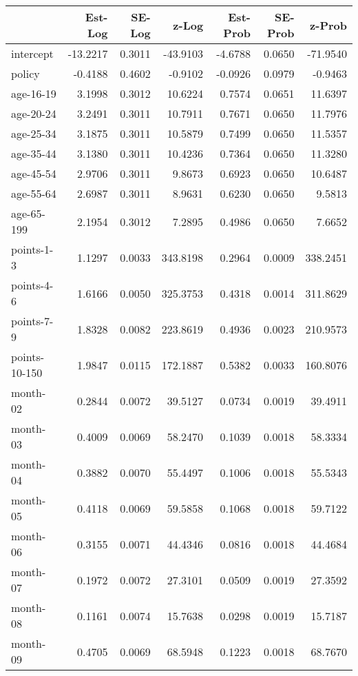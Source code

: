 \documentclass[10pt]{article}
\begin{document}
\begin{table}[ht]
\centering
\begin{tabular}{lrrrrrr}
  \hline
 & Est-Log & SE-Log & z-Log & Est-Prob & SE-Prob & z-Prob \\ 
  \hline
intercept & -13.2217 & 0.3011 & -43.9103 & -4.6788 & 0.0650 & -71.9540 \\ 
  policy & -0.4188 & 0.4602 & -0.9102 & -0.0926 & 0.0979 & -0.9463 \\ 
  age-16-19 & 3.1998 & 0.3012 & 10.6224 & 0.7574 & 0.0651 & 11.6397 \\ 
  age-20-24 & 3.2491 & 0.3011 & 10.7911 & 0.7671 & 0.0650 & 11.7976 \\ 
  age-25-34 & 3.1875 & 0.3011 & 10.5879 & 0.7499 & 0.0650 & 11.5357 \\ 
  age-35-44 & 3.1380 & 0.3011 & 10.4236 & 0.7364 & 0.0650 & 11.3280 \\ 
  age-45-54 & 2.9706 & 0.3011 & 9.8673 & 0.6923 & 0.0650 & 10.6487 \\ 
  age-55-64 & 2.6987 & 0.3011 & 8.9631 & 0.6230 & 0.0650 & 9.5813 \\ 
  age-65-199 & 2.1954 & 0.3012 & 7.2895 & 0.4986 & 0.0650 & 7.6652 \\ 
  points-1-3 & 1.1297 & 0.0033 & 343.8198 & 0.2964 & 0.0009 & 338.2451 \\ 
  points-4-6 & 1.6166 & 0.0050 & 325.3753 & 0.4318 & 0.0014 & 311.8629 \\ 
  points-7-9 & 1.8328 & 0.0082 & 223.8619 & 0.4936 & 0.0023 & 210.9573 \\ 
  points-10-150 & 1.9847 & 0.0115 & 172.1887 & 0.5382 & 0.0033 & 160.8076 \\ 
  month-02 & 0.2844 & 0.0072 & 39.5127 & 0.0734 & 0.0019 & 39.4911 \\ 
  month-03 & 0.4009 & 0.0069 & 58.2470 & 0.1039 & 0.0018 & 58.3334 \\ 
  month-04 & 0.3882 & 0.0070 & 55.4497 & 0.1006 & 0.0018 & 55.5343 \\ 
  month-05 & 0.4118 & 0.0069 & 59.5858 & 0.1068 & 0.0018 & 59.7122 \\ 
  month-06 & 0.3155 & 0.0071 & 44.4346 & 0.0816 & 0.0018 & 44.4684 \\ 
  month-07 & 0.1972 & 0.0072 & 27.3101 & 0.0509 & 0.0019 & 27.3592 \\ 
  month-08 & 0.1161 & 0.0074 & 15.7638 & 0.0298 & 0.0019 & 15.7187 \\ 
  month-09 & 0.4705 & 0.0069 & 68.5948 & 0.1223 & 0.0018 & 68.7670 \\ 

\end{tabular}
\end{table}
\end{document}
